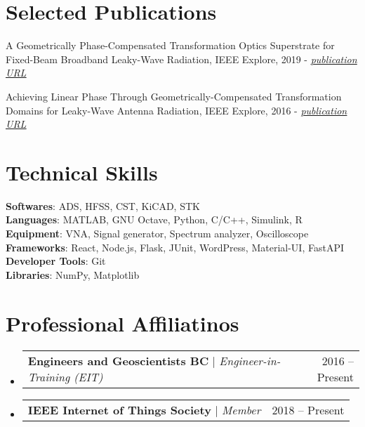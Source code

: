 \documentclass[letterpaper,11pt]{article}
\makeatletter
\newcommand{\resumeProjectHeading}[2]{
    \item
    \begin{tabular*}{0.97\textwidth}{l@{\extracolsep{\fill}}r}
      \small#1 & #2 \\
    \end{tabular*}\vspace{-7pt}
}
\newcommand{\resumeSubHeadingListStart}{\begin{itemize}[leftmargin=0.15in, label={}]}
\newcommand{\resumeSubHeadingListEnd}{\end{itemize}}
\makeatother
\begin{document}
%
\section{Selected Publications}
 \begin{itemize}[leftmargin=0.15in, label={\tiny$\bullet$}]
    \small{
    \item{A Geometrically Phase-Compensated Transformation Optics Superstrate for Fixed-Beam Broadband Leaky-Wave Radiation, IEEE Explore, 2019 - \href{https://ieeexplore.ieee.org/document/8739640}{\textit{\underline{publication URL}}}}
    \item{ Achieving Linear Phase Through Geometrically-Compensated Transformation Domains for Leaky-Wave Antenna Radiation, IEEE Explore, 2016 - \href{https://ieeexplore.ieee.org/document/7695749}{\textit{\underline{publication URL}}}}
    }
 \end{itemize}


\section{Technical Skills}
 \begin{itemize}[leftmargin=0.15in, label={}]
    \small{\item{
     \textbf{Softwares}{: ADS, HFSS, CST, KiCAD, STK} \\
     \textbf{Languages}{: MATLAB, GNU Octave, Python, C/C++, Simulink, R} \\
     \textbf{Equipment}{: VNA, Signal generator, Spectrum analyzer, Oscilloscope} \\
     \textbf{Frameworks}{: React, Node.js, Flask, JUnit, WordPress, Material-UI, FastAPI} \\
     \textbf{Developer Tools}{: Git} \\
     \textbf{Libraries}{: NumPy, Matplotlib}
    }}
 \end{itemize}

%
\section{Professional Affiliatinos}
    \resumeSubHeadingListStart
      \resumeProjectHeading
          {\textbf{Engineers and Geoscientists BC} $|$ \emph{Engineer-in-Training (EIT) }}{2016 -- Present}

      \resumeProjectHeading
          {\textbf{IEEE Internet of Things Society} $|$ \emph{Member}}{2018 -- Present}

    \resumeSubHeadingListEnd
\end{document}
